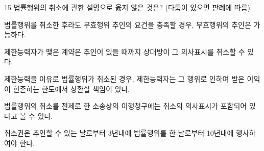 \begin{question}{15}
법률행위의 취소에 관한 설명으로 옳지 않은 것은? (다툼이 있으면 판례에 따름)
\begin{choices}
  \item 법률행위를 취소한 후라도 무효행위 추인의 요건을 충족할 경우, 무효행위의 추인은 가능하다.
  \item 제한능력자가 맺은 계약은 추인이 있을 때까지 상대방이 그 의사표시를 취소할 수 있다.
  \item 제한능력을 이유로 법률행위가 취소된 경우, 제한능력자는 그 행위로 인하여 받은 이익이 현존하는 한도에서 상환할 책임이 있다.
  \item 법률행위의 취소를 전제로 한 소송상의 이행청구에는 취소의 의사표시가 포함되어 있다고 볼 수 있다.
  \item 취소권은 추인할 수 있는 날로부터 3년내에 법률행위를 한 날로부터 10년내에 행사하여야 한다.
\end{choices}
\end{question}
